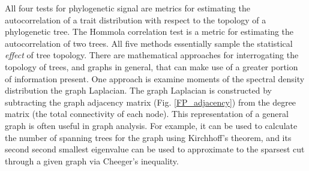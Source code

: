 All four tests for phylogenetic signal are metrics for estimating the autocorrelation of a trait distribution with respect to the topology of a phylogenetic tree. The Hommola correlation test is a metric for estimating the autocorrelation of two trees. All five methods essentially sample the statistical {\em effect} of tree topology. There are mathematical approaches for interrogating the topology of trees, and graphs in general, that can make use of a greater portion of information present. One approach is examine moments of the spectral density distribution the graph Laplacian. The graph Laplacian is constructed by subtracting the graph adjacency matrix (Fig. \ref{FP_adjacency}) from the degree matrix (the total connectivity of each node). This representation of a general graph is often useful in graph analysis. For example, it can be used to calculate the number of spanning trees for the graph using Kirchhoff's theorem, and its second second smallest eigenvalue can be used to approximate to the sparsest cut through a given graph via Cheeger's inequality. 

